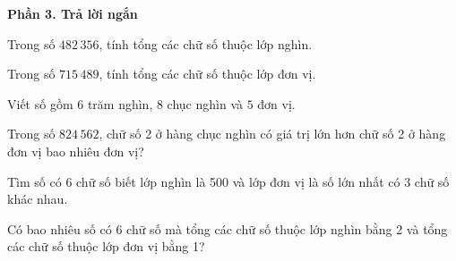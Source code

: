 \textbf{Phần 3. Trả lời ngắn}

\begin{ex} %
Trong số $482\,356$, tính tổng các chữ số thuộc lớp nghìn.
\end{ex}

\begin{ex} %
Trong số $715\,489$, tính tổng các chữ số thuộc lớp đơn vị.
\end{ex}

\begin{ex} %
Viết số gồm $6$ trăm nghìn, $8$ chục nghìn và $5$ đơn vị.
\end{ex}

\begin{ex} %
Trong số $824\,562$, chữ số 2 ở hàng chục nghìn có giá trị lớn hơn chữ số 2 ở hàng đơn vị bao nhiêu đơn vị?
\end{ex}

\begin{ex} %
Tìm số có 6 chữ số biết lớp nghìn là 500 và lớp đơn vị là số lớn nhất có 3 chữ số khác nhau.
\end{ex}

\begin{ex} %
Có bao nhiêu số có 6 chữ số mà tổng các chữ số thuộc lớp nghìn bằng 2 và tổng các chữ số thuộc lớp đơn vị bằng 1?
\end{ex}
